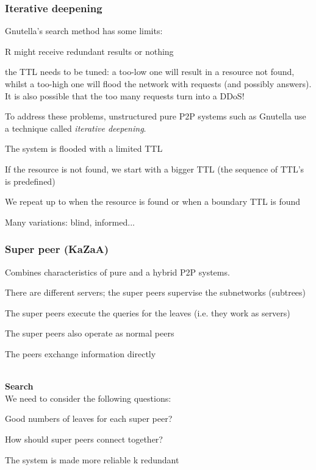 \documentclass[paper=a4, fontsize=11pt]{scrartcl} %
\numberwithin{equation}{section} %
\numberwithin{figure}{section} %
\numberwithin{table}{section} %
\begin{document}
\subsubsection*{Iterative deepening}
Gnutella's search method has some limits:
\begin{compactenum}
	\item R might receive redundant results or nothing
	\item the TTL needs to be tuned: a too-low one will result in a resource not found, whilst a too-high one will flood the network with requests (and possibly answers). It is also possible that the too many requests turn into a DDoS!
\end{compactenum}
To address these problems, unstructured pure P2P systems such as Gnutella use a technique called \textit{iterative deepening}.
\begin{compactenum}
\item The system is flooded with a limited TTL
\item If the resource is not found, we start with a bigger TTL (the sequence of TTL's is predefined)
\item We repeat up to when the resource is found or when a boundary TTL is found

Many variations: blind, informed...
\end{compactenum}

\subsubsection*{Super peer (KaZaA)}
Combines characteristics of pure and a hybrid P2P systems.
\begin{compactitem}
\item There are different servers; the super peers supervise the subnetworks (subtrees)
\item The super peers execute the queries for the leaves (i.e. they work as servers)
\item The super peers also operate as normal peers
\item The peers exchange information directly
\end{compactitem}
~ \\  \textbf{Search} \\
We need to consider the following questions:
\begin{compactitem}
\item Good numbers  of leaves for each super peer?
\item How should super peers connect together?
\item The system is made more reliable k redundant
\end{compactitem}
\end{document}
